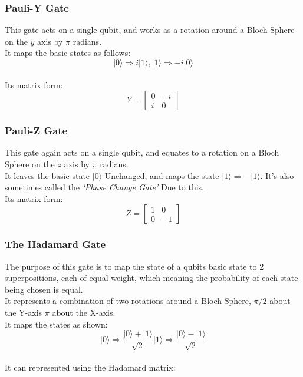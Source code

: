 \documentclass[../main.tex]{subfiles}
\begin{document}
\subsubsection{Pauli-Y Gate}

This gate acts on a single qubit, and works as a rotation around a
Bloch Sphere on the \(y\) axis by \(\pi\) radians.\\
It maps the basic states as follows:\\
\[
\lvert0\rangle \Rightarrow i\lvert1\rangle, \lvert1\rangle \Rightarrow -i\lvert0\rangle\]\\
Its matrix form:\\
\begin{equation}
	Y = \left[ \begin{matrix} 0 & -i\\i & 0\end{matrix} \right]
\end{equation}

\subsubsection{Pauli-Z Gate}

This gate again acts on a single qubit, and equates to a rotation on a
Bloch Sphere on the \(z\) axis by \(\pi\) radians.\\
It leaves the basic state \(\lvert0\rangle\) Unchanged, and maps the state
\(\lvert1\rangle \Rightarrow -\lvert1\rangle\). It's also sometimes called the
\emph{`Phase Change Gate'} Due to this.\\
Its matrix form:\\
\begin{equation}
	Z = \left[ \begin{matrix} 1 & 0\\0 & -1\end{matrix} \right]
\end{equation}

\subsubsection{The Hadamard Gate}

The purpose of this gate is to map the state of a qubits basic state to
2 superpositions, each of equal weight, which meaning the probability of
each state being chosen is equal.\\
It represents a combination of two rotations around a Bloch Sphere,
\(\pi /2\) about the Y-axis \(\pi\) about the X-axis.\\
It maps the states as shown:\\
\[
\lvert0\rangle \Rightarrow \frac{\lvert0\rangle + \lvert1\rangle}{ \sqrt{2}}                 \lvert1\rangle \Rightarrow \frac{\lvert0\rangle - \lvert1\rangle}{ \sqrt{2}}\]\\
It can represented using the Hadamard matrix:\\
\end{document}
